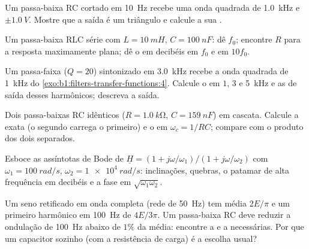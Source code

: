 \begin{exercise}[$\star\star$]\label{exo:b1:filters-transfer-functions:6}
Um passa-baixa RC cortado em \qty{10}{Hz} recebe uma onda quadrada de \qty{1.0}{kHz}
e  $\pm\qty{1.0}{V}$. Mostre que a saída é um triângulo
e calcule a sua .
\end{exercise}

\begin{exercise}[$\star\star$]\label{exo:b1:filters-transfer-functions:7}
Um passa-baixa RLC série com $L = \qty{10}{mH}$, $C = \qty{100}{nF}$: dê
$f_0$; encontre $R$ para a resposta maximamente plana; dê o  em
decibéis em $f_0$ e em $10f_0$.
\end{exercise}

\begin{exercise}[$\star\star$]\label{exo:b1:filters-transfer-functions:8}
Um passa-faixa ($Q = 20$) sintonizado em \qty{3.0}{kHz} recebe a onda quadrada de
\qty{1}{kHz} do \cref{exo:b1:filters-transfer-functions:4}. Calcule o
 em $1$, $3$ e \qty{5}{kHz} e as  de saída desses
harmônicos; descreva a saída.
\end{exercise}

\begin{exercise}[$\star\star$]\label{exo:b1:filters-transfer-functions:9}
Dois passa-baixas RC idênticos ($R = \qty{1.0}{k\ohm}$, $C = \qty{159}{nF}$)
em cascata. Calcule a  exata (o segundo carrega o
primeiro) e o  em $\omega_c = 1/RC$; compare com o produto dos
dois  separados.
\end{exercise}

\begin{exercise}[$\star\star\star$]\label{exo:b1:filters-transfer-functions:10}
Esboce as assíntotas de Bode de $\underline H = (1 + j\omega/\omega_1)/
(1 + j\omega/\omega_2)$ com $\omega_1 = \qty{100}{rad/s}$, $\omega_2 =
\qty{1e4}{rad/s}$: inclinações, quebras, o patamar de alta frequência em
decibéis e a fase em $\sqrt{\omega_1\omega_2}$.
\end{exercise}

\begin{exercise}[$\star\star\star$]\label{exo:b1:filters-transfer-functions:11}
Um seno retificado em onda completa (rede de \qty{50}{Hz}) tem média $2E/\pi$ e
um primeiro harmônico em \qty{100}{Hz} de  $4E/3\pi$. Um passa-baixa
RC deve reduzir a ondulação de \qty{100}{Hz} abaixo de $1\%$ da
média: encontre a  e a  necessárias. Por que
um capacitor sozinho (com a resistência de carga) é a escolha usual?
\end{exercise}

